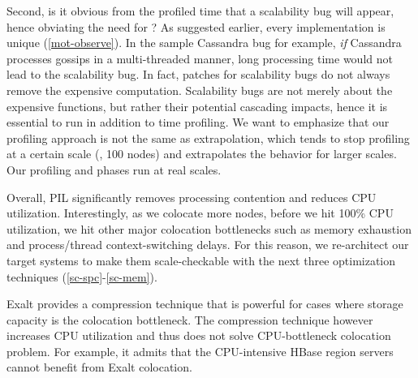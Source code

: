 




Second, is it obvious from the profiled time that a scalability bug will
appear, hence obviating the need for \sck?  
%
As suggested earlier, every implementation is unique
(\sec\ref{mot-observe}).  In the sample Cassandra bug for example, {\em if} Cassandra
processes gossips in a multi-threaded manner, long processing time would
not lead to the scalability bug.
%
In fact, patches for scalability bugs do not always remove the expensive
computation.
%
Scalability bugs are not merely about the expensive functions, but rather
their potential cascading impacts, hence it is essential to run \sck 
in addition to time profiling.
We want to emphasize that our profiling approach is not the same as
extrapolation, which tends to stop profiling at a certain 
scale (\eg, 100 nodes)
and extrapolates the behavior for larger scales.  Our
profiling and \sck phases run at real scales.


\vfive Overall, PIL significantly removes processing contention and
reduces CPU utilization.  Interestingly, as we colocate more nodes, before
we hit 100\% CPU utilization, we hit other major colocation bottlenecks
such as memory exhaustion and process/thread context-switching delays.
%
For this reason, we re-architect our target systems to make them
scale-checkable with the next three optimization techniques
(\sec\ref{sc-spc}-\sec\ref{sc-mem}).



Exalt \cite{exalt} provides a compression technique that is powerful for
cases where storage capacity is the colocation bottleneck.
The compression technique however increases CPU utilization
and thus does not solve CPU-bottleneck colocation problem.
For example, it admits that the CPU-intensive HBase region servers
cannot benefit from Exalt colocation. 
\fi
